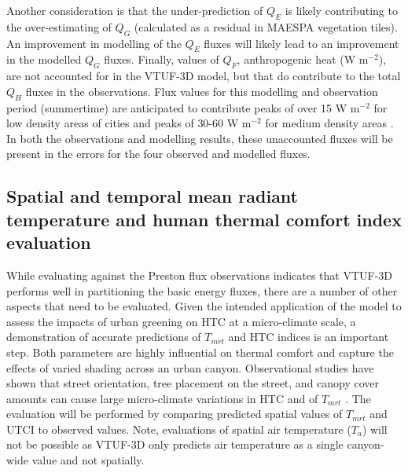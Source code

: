 \documentclass[final,3p,times,authoryear]{elsarticle}
\begin{document}
Another consideration is that the under-prediction of $Q_{E}$ is likely contributing to the over-estimating of $Q_{G}$ (calculated as a residual in MAESPA vegetation tiles). An improvement in modelling of the $Q_{E}$ fluxes will likely lead to an improvement in the modelled $Q_{G}$ fluxes. Finally, values of $Q_{F}$, anthropogenic heat (W m$^{-2}$), are not accounted for in the VTUF-3D model, but that do contribute to the total $Q_{H}$ fluxes in the observations. Flux values for this modelling and observation period (summertime) are anticipated to contribute peaks of over 15 W m$^{-2}$ for low density areas of cities and peaks of 30-60 W m$^{-2}$ for medium density areas \citep{Sailor2004}. In both the observations and modelling results, these unaccounted fluxes will be present in the errors for the four observed and modelled fluxes. 






\subsection{Spatial and temporal mean radiant temperature and human thermal comfort index evaluation}\label{sec:CoMValidations}

While evaluating against the Preston flux observations indicates that VTUF-3D performs well in partitioning the basic energy fluxes, there are a number of other aspects that need to be evaluated. Given the intended application of the model to assess the impacts of urban greening on HTC at a micro-climate scale, a demonstration of accurate predictions of $T_{mrt}$ and HTC indices is an important step. Both parameters are highly influential on thermal comfort and capture the effects of varied shading across an urban canyon. Observational studies have shown that street orientation, tree placement on the street, and canopy cover amounts can cause large micro-climate variations in HTC and of $T_{mrt}$ \citep{Sanusi2016,Oliveira2011,Ali-Toudert2007}. The evaluation will be performed by comparing predicted spatial values of $T_{mrt}$ and UTCI to observed values. Note, evaluations of spatial air temperature ($T_{a}$) will not be possible as VTUF-3D only predicts air temperature as a single canyon-wide value and not spatially.
\end{document}
